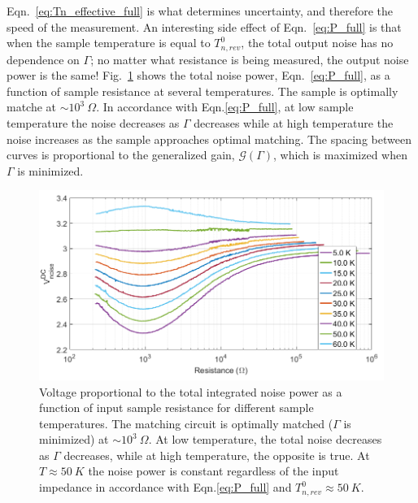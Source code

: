 Eqn.~\ref{eq:Tn_effective_full} is what determines uncertainty, and therefore the speed of the measurement. An interesting side effect of Eqn.~\ref{eq:P_full} is that when the sample temperature is equal to $T_{n,rev}^0$, the total output noise has no dependence on $\Gamma$; no matter what resistance is being measured, the output noise power is the same! Fig.~\ref{fig:JNT_Vn_vs_R} shows the total noise power, Eqn.~\ref{eq:P_full}, as a function of sample resistance at several temperatures. The sample is optimally matche at ${\sim}10^3~\Omega$. In accordance with Eqn.\ref{eq:P_full}, at low sample temperature the noise decreases as $\Gamma$ decreases while at high temperature the noise increases as the sample approaches optimal matching. The spacing between curves is proportional to the generalized gain, $\mathcal{G}(\Gamma)$, which is maximized when $\Gamma$ is minimized.
\begin{figure}
\centering
\includegraphics[width=120mm]{figures/Johnson_noise_thermometry/Vn_vs_R.png}
\caption{Voltage proportional to the total integrated noise power as a function of input sample resistance for different sample temperatures. The matching circuit is optimally matched ($\Gamma$ is minimized) at ${\sim}10^3~\Omega$. At low temperature, the total noise decreases as $\Gamma$ decreases, while at high temperature, the opposite is true. At $T\approx50~K$ the noise power is constant regardless of the input impedance in accordance with Eqn.\ref{eq:P_full} and $T_{n,rev}^0\approx50~K$.}
\label{fig:JNT_Vn_vs_R}
\end{figure}

